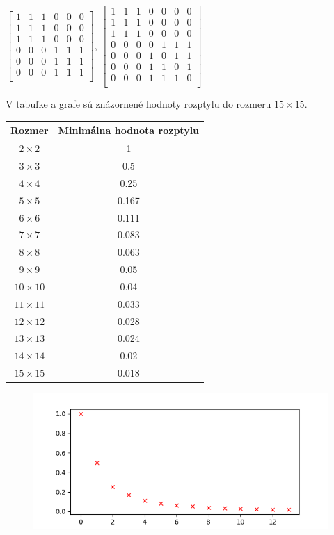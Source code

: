 \begin{center}
$
\begin{bmatrix}
1 & 1 & 1 & 0 & 0 & 0 \\
1 & 1 & 1 & 0 & 0 & 0 \\
1 & 1 & 1 & 0 & 0 & 0 \\
0 & 0 & 0 & 1 & 1 & 1 \\
0 & 0 & 0 & 1 & 1 & 1 \\
0 & 0 & 0 & 1 & 1 & 1 \\
\end{bmatrix}
$,
$
\begin{bmatrix}
1 & 1 & 1 & 0 & 0 & 0 & 0 \\
1 & 1 & 1 & 0 & 0 & 0 & 0 \\
1 & 1 & 1 & 0 & 0 & 0 & 0 \\
0 & 0 & 0 & 0 & 1 & 1 & 1 \\
0 & 0 & 0 & 1 & 0 & 1 & 1 \\
0 & 0 & 0 & 1 & 1 & 0 & 1 \\
0 & 0 & 0 & 1 & 1 & 1 & 0 \\
\end{bmatrix}
$
\end{center}

V tabuľke a grafe sú znázornené hodnoty rozptylu do rozmeru $15 \times 15$.

\begin{center}
\begin{tabular}{ |c|c|}
  \hline
  Rozmer & Minimálna hodnota rozptylu \\ \hline
  $2 \times 2$ & 1 \\ \hline
  $3 \times 3$ & 0.5 \\ \hline
  $4 \times 4$ & 0.25 \\ \hline
  $5 \times 5$ & 0.167 \\ \hline
  $6 \times 6$ & 0.111 \\ \hline
  $7 \times 7$ & 0.083 \\ \hline
  $8 \times 8$ & 0.063 \\ \hline
  $9 \times 9$ & 0.05 \\ \hline
  $10 \times 10$ & 0.04 \\ \hline
  $11 \times 11$ & 0.033 \\ \hline
  $12 \times 12$ & 0.028 \\ \hline
  $13 \times 13$ & 0.024 \\ \hline
  $14 \times 14$ & 0.02 \\ \hline
  $15 \times 15$ & 0.018 \\ \hline
\end{tabular}
\end{center}

\begin{figure}[!h]
  \centering
  \includegraphics{minimalny_rozptyl.png}
\end{figure}
